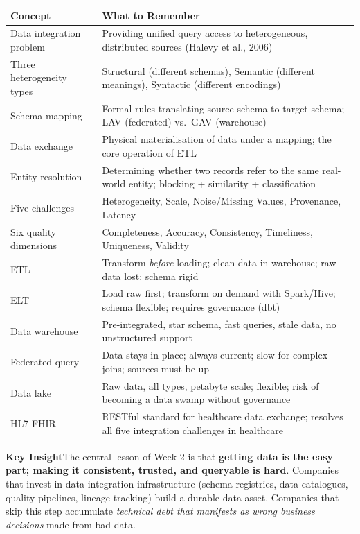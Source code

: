 \documentclass[12pt,a4paper]{article}
\newcommand{\insightbox}[1]{%
  \noindent
  \colorbox{PUGold!18}{%
    \begin{minipage}{\dimexpr\linewidth-2\fboxsep}
      \vspace{4pt}\textcolor{PUGold!70!black}{\textbf{Key Insight}}\quad #1
      \vspace{4pt}
    \end{minipage}%
  }\par\vspace{6pt}%
}
\begin{document}
\begin{center}
\renewcommand{\arraystretch}{1.6}
\begin{tabular}{p{4.5cm}p{9.0cm}}
  \toprule
  \textbf{Concept} & \textbf{What to Remember} \\
  \midrule
  Data integration problem & Providing unified query access to heterogeneous, distributed sources (Halevy et al., 2006) \\
  Three heterogeneity types & Structural (different schemas), Semantic (different meanings), Syntactic (different encodings) \\
  Schema mapping & Formal rules translating source schema to target schema; LAV (federated) vs.\ GAV (warehouse) \\
  Data exchange & Physical materialisation of data under a mapping; the core operation of ETL \\
  Entity resolution & Determining whether two records refer to the same real-world entity; blocking + similarity + classification \\
  Five challenges & Heterogeneity, Scale, Noise/Missing Values, Provenance, Latency \\
  Six quality dimensions & Completeness, Accuracy, Consistency, Timeliness, Uniqueness, Validity \\
  ETL & Transform \textit{before} loading; clean data in warehouse; raw data lost; schema rigid \\
  ELT & Load raw first; transform on demand with Spark/Hive; schema flexible; requires governance (dbt) \\
  Data warehouse & Pre-integrated, star schema, fast queries, stale data, no unstructured support \\
  Federated query & Data stays in place; always current; slow for complex joins; sources must be up \\
  Data lake & Raw data, all types, petabyte scale; flexible; risk of becoming a data swamp without governance \\
  HL7 FHIR & RESTful standard for healthcare data exchange; resolves all five integration challenges in healthcare \\
  \bottomrule
\end{tabular}
\end{center}

\insightbox{The central lesson of Week 2 is that \textbf{getting data is the easy part; making it consistent, trusted, and queryable is hard}.  Companies that invest in data integration infrastructure (schema registries, data catalogues, quality pipelines, lineage tracking) build a durable data asset.  Companies that skip this step accumulate \textit{technical debt that manifests as wrong business decisions} made from bad data.}
\end{document}
